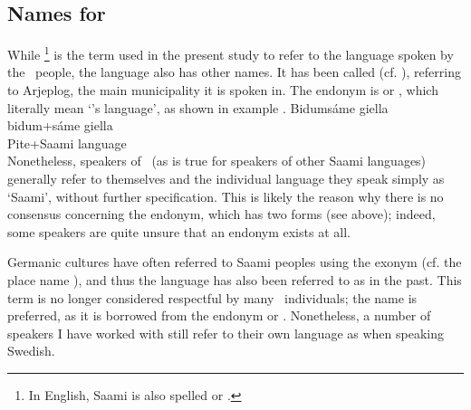 \subsection{Names for \PS}\label{onomastics}
While \footnote{In English, Saami is also spelled  or .} %
is the term used in the present study to refer to the language spoken by the \PS\ people, the language also has other names. It has been called  (cf. %
\cite{Lehtiranta1992}), referring to Arjeplog, the main municipality it is spoken in. The endonym is  or , which literally mean ‘\PS’s language’, as shown in example . 
\ea\label{bidumsaamegiella}
\glll Bidumsáme giella\\ %
	bidum+sáme giella\\
	Pite+Saami\BS{} language\BS{}\\\nopagebreak
{} 
\z
Nonetheless, speakers of \PS\ (as is true for speakers of other Saami languages) generally refer to themselves and the individual language they speak simply as ‘Saami’, without further specification. This is likely the reason why there is no consensus concerning the endonym, which has  two forms (see above); indeed, some speakers are quite unsure that an endonym exists at all. %

Germanic cultures have often referred to Saami peoples using the exonym  (cf. the place name ), and thus the language has also been referred to as  in the past. This term is no longer considered respectful by many \PS\ individuals; the name  is preferred, as it is borrowed from the endonym  or . Nonetheless, a number of speakers I have worked with still refer to their own language as  when speaking Swedish. 

